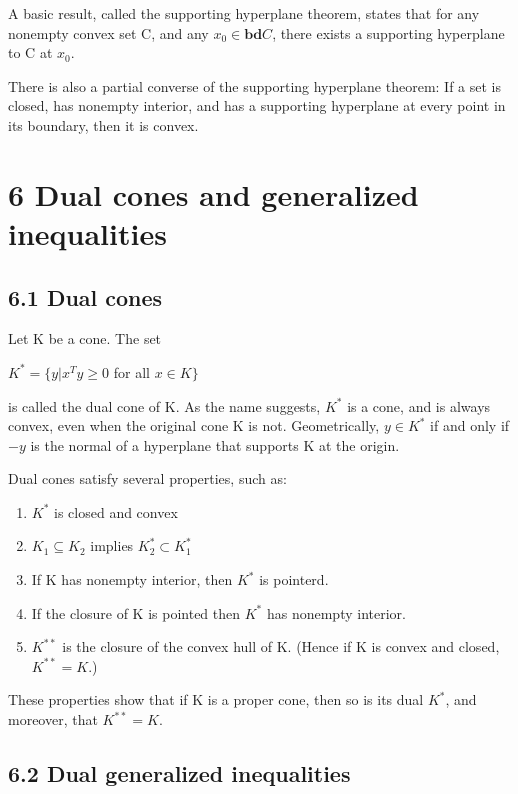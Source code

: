 \documentclass{article}
\begin{document}
A basic result, called the supporting hyperplane theorem, states that for any
nonempty convex set C, and any $x_0 \in \mathbf{bd}C$, there exists a supporting hyperplane to
C at $x_0$.

There is also a partial converse of the supporting hyperplane theorem: If a set
is closed, has nonempty interior, and has a supporting hyperplane at every point
in its boundary, then it is convex.

\section*{6 Dual cones and generalized inequalities}

\subsection*{6.1 Dual cones}

Let K be a cone. The set

\begin{center}
    $K^*=\{y | x^T y \ge 0$ for all $x \in K\}$   
\end{center}

is called the dual cone of K. As the name suggests, $K^*$ is a cone, and is always
convex, even when the original cone K is not.
Geometrically, $y \in K^*$ if and only if $-y$ is the normal of a hyperplane that
supports K at the origin.

\vspace*{0.3cm}

Dual cones satisfy several properties, such as:

\begin{enumerate}
    \item $K^*$ is closed and convex
    \item $K_1\subseteq K_2$ implies $K_2^*\subset K_1^*$
    \item If K has nonempty interior, then $K^*$ is pointerd.
    \item If the closure of K is pointed then $K^*$ has nonempty interior.
    \item $K^{**}$ is the closure of the convex hull of K. (Hence if K is convex and closed,
    $K^{**} = K$.)
\end{enumerate}

These properties show that if K is a proper cone, then so is its
dual $K^{*}$, and moreover, that $K^{**} = K$.

\subsection*{6.2 Dual generalized inequalities}
\end{document}
